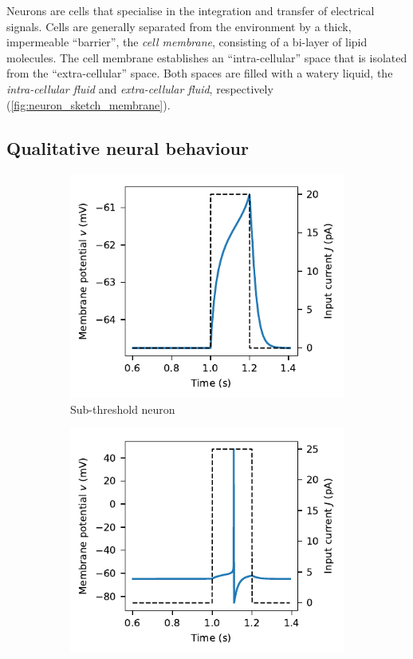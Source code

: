 \documentclass[10pt,letterpaper,oneside]{article}
\begin{document}
Neurons are cells that specialise in the integration and transfer of electrical signals. Cells are generally separated from the environment by a thick, impermeable \enquote{barrier}, the \emph{cell membrane}, consisting of a bi-layer of lipid molecules. The cell membrane establishes an \enquote{intra-cellular} space that is isolated from the \enquote{extra-cellular} space. Both spaces are filled with a watery liquid, the \emph{intra-cellular fluid} and \emph{extra-cellular fluid}, respectively (\cref{fig:neuron_sketch_membrane}).

\subsection{Qualitative neural behaviour}

\begin{figure}
	\centering%
	\begin{subfigure}{0.5\textwidth}%
		\centering
		\includegraphics{media/hh_neuron_sub_threshold.pdf}%
		\caption{Sub-threshold neuron}%
		\label{fig:hh_neuron_sub_threshold}
	\end{subfigure}%
	\begin{subfigure}{0.5\textwidth}%
		\centering
		\includegraphics{media/hh_neuron_super_threshold.pdf}%

\end{subfigure}
\end{figure}
\end{document}
